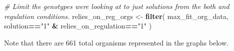 \documentclass[
]{book}
\newenvironment{Shaded}{\begin{snugshade}}{\end{snugshade}}
\newcommand{\CommentTok}[1]{\textcolor[rgb]{0.56,0.35,0.01}{\textit{#1}}}
\newcommand{\KeywordTok}[1]{\textcolor[rgb]{0.13,0.29,0.53}{\textbf{#1}}}
\newcommand{\NormalTok}[1]{#1}
\newcommand{\OperatorTok}[1]{\textcolor[rgb]{0.81,0.36,0.00}{\textbf{#1}}}
\newcommand{\StringTok}[1]{\textcolor[rgb]{0.31,0.60,0.02}{#1}}
\begin{document}
\begin{Shaded}
\begin{Highlighting}[]
\CommentTok{\# Limit the genotypes we\textquotesingle{}re looking at to just solutions from the \textquotesingle{}both\textquotesingle{} and \textquotesingle{}regulation\textquotesingle{} conditions.}
\NormalTok{relies\_on\_reg\_orgs \textless{}{-}}\StringTok{ }\KeywordTok{filter}\NormalTok{(}
\NormalTok{  max\_fit\_org\_data,}
\NormalTok{  solution}\OperatorTok{==}\StringTok{"1"} \OperatorTok{\&}\StringTok{ }\NormalTok{relies\_on\_regulation}\OperatorTok{==}\StringTok{"1"}
\NormalTok{)}
\end{Highlighting}
\end{Shaded}

Note that there are 661 total organisms represented in the graphs below.
\end{document}

